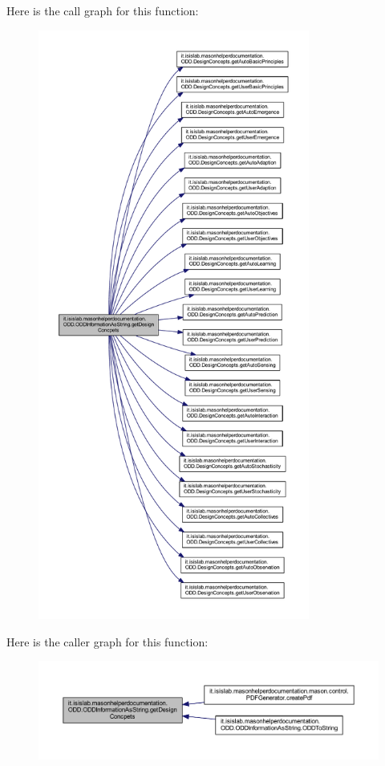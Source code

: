 Here is the call graph for this function\-:
\nopagebreak
\begin{figure}[H]
\begin{center}
\leavevmode
\includegraphics[height=550pt]{classit_1_1isislab_1_1masonhelperdocumentation_1_1_o_d_d_1_1_o_d_d_information_as_string_ab296e80354c57e17b9e04f91476f3bb9_cgraph}
\end{center}
\end{figure}




Here is the caller graph for this function\-:
\nopagebreak
\begin{figure}[H]
\begin{center}
\leavevmode
\includegraphics[width=350pt]{classit_1_1isislab_1_1masonhelperdocumentation_1_1_o_d_d_1_1_o_d_d_information_as_string_ab296e80354c57e17b9e04f91476f3bb9_icgraph}
\end{center}
\end{figure}



